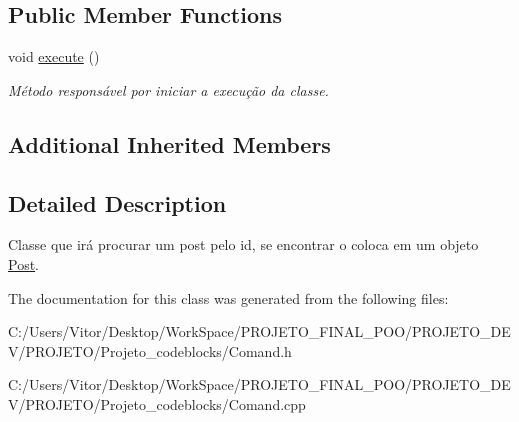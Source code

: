 \subsection*{Public Member Functions}
\begin{DoxyCompactItemize}
\item 
\hypertarget{class_command_find_post_a271fd0e0c327fe009caa71a4df92a454}{void \hyperlink{class_command_find_post_a271fd0e0c327fe009caa71a4df92a454}{execute} ()}\label{class_command_find_post_a271fd0e0c327fe009caa71a4df92a454}

\begin{DoxyCompactList}\small\item\em Método responsável por iniciar a execução da classe. \end{DoxyCompactList}\end{DoxyCompactItemize}
\subsection*{Additional Inherited Members}


\subsection{Detailed Description}
Classe que irá procurar um post pelo id, se encontrar o coloca em um objeto \hyperlink{class_post}{Post}. 

The documentation for this class was generated from the following files\-:\begin{DoxyCompactItemize}
\item 
C\-:/\-Users/\-Vitor/\-Desktop/\-Work\-Space/\-P\-R\-O\-J\-E\-T\-O\-\_\-\-F\-I\-N\-A\-L\-\_\-\-P\-O\-O/\-P\-R\-O\-J\-E\-T\-O\-\_\-\-D\-E\-V/\-P\-R\-O\-J\-E\-T\-O/\-Projeto\-\_\-codeblocks/Comand.\-h\item 
C\-:/\-Users/\-Vitor/\-Desktop/\-Work\-Space/\-P\-R\-O\-J\-E\-T\-O\-\_\-\-F\-I\-N\-A\-L\-\_\-\-P\-O\-O/\-P\-R\-O\-J\-E\-T\-O\-\_\-\-D\-E\-V/\-P\-R\-O\-J\-E\-T\-O/\-Projeto\-\_\-codeblocks/Comand.\-cpp\end{DoxyCompactItemize}
